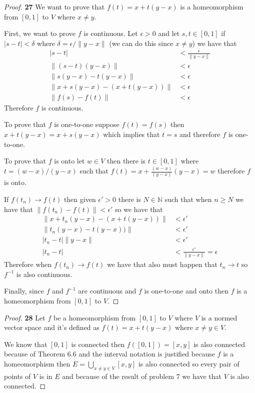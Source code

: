\documentclass[11pt]{article}
\newcommand{\N}{\mathbb{N}}
\theoremstyle{definition}
\begin{document}
\cleardoublepage
	\begin{proof}{\textbf{27}}
        We want to prove that $f(t) = x + t(y-x)$ is a homeomorphism from $[0,1]$
        to $V$ where $x \neq y$.

        First, we want to prove $f$ is continuous. Let $\epsilon > 0$ and let
        $s,t \in [0,1]$ if $|s-t|< \delta$ where $\delta = \epsilon/\|y-x\|$
        (we can do this since $x\neq y$) we have that
        \begin{align*}
            |s-t| &< \frac{\epsilon}{\|y-x\|}\\
            \|(s-t)(y-x)\| &< \epsilon\\
            \|s(y-x)-t(y-x)\| &< \epsilon\\
            \|x + s(y-x)-(x + t(y-x))\| &< \epsilon\\
            \|f(s)-f(t)\| &< \epsilon
        \end{align*}
        Therefore $f$ is continuous.

        To prove that $f$ is one-to-one suppose $f(t) = f(s)$ then
        $x + t(y-x) = x + s(y-x)$ which implies that $t=s$ and therefore $f$ is
        one-to-one.

        To prove that $f$ is onto let $w \in V$ then there is $t \in [0,1]$
        where $t = (w-x)/(y-x)$ such that
        $f(t) = x + \frac{(w-x)}{(y-x)}(y-x) = w$ therefore $f$ is onto.

        If $f(t_n) \to f(t)$ then given $\epsilon'>0$ there is $N \in \N$ such
        that when $n \geq N$ we have that $\|f(t_n) - f(t)\| < \epsilon'$
        so we have that
        \begin{align*}
            \|x + t_n(y-x)-(x + t(y-x))\| &< \epsilon'\\
            \|t_n(y-x)- t(y-x))\| &< \epsilon'\\
            |t_n - t|\|y-x\| &< \epsilon'\\
            |t_n - t| &< \frac{\epsilon'}{\|y-x\|} = \epsilon
        \end{align*}
        Therefore when $f(t_n) \to f(t)$ we have that also must happen that
        $t_n \to t$ so $f^{-1}$ is also continuous.

        Finally, since $f$ and $f^{-1}$ are continuous and $f$ is one-to-one
        and onto then $f$ is a homeomorphism from $[0,1]$ to $V$.
    \end{proof}
	\begin{proof}{\textbf{28}}
        Let $f$ be a homeomorphism from $[0,1]$ to $V$ where $V$ is a normed
        vector space and it's defined as $f(t) = x + t(y - x)$ where
        $x\neq y\in V$.
        
        We know that $[0,1]$ is connected then $f([0,1]) = [x,y]$ is also
        connected because of Theorem 6.6 and the interval notation is justified
        because $f$ is a homeomorphism then $E = \bigcup_{x\neq y \in V} [x,y]$
        is also connected so every pair of points of $V$ is in $E$ and because
        of the result of problem 7 we have that $V$ is also connected.   
    \end{proof}
\end{document}
